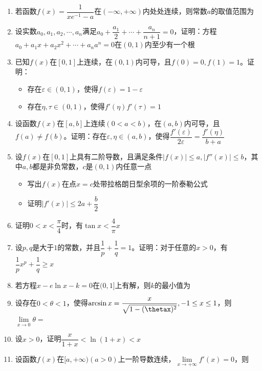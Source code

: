 \documentclass[./book.tex]{subfiles}
\begin{document}
    \begin{enumerate}
        \item 若函数$f(x) = \dfrac{1}{xe^{-1} - a}$在$(-\infty, +\infty)$内处处连续，则常数$a$的取值范围为
        \item 设实数$a_0, a_1, a_2, \cdots, a_n$满足$a_0 + \dfrac{a_1}{2} + \cdots + \dfrac{a_n}{n+1} = 0$，证明：方程$a_0 + a_{1}x + a_{2}x^2 + \cdots + a_{n}a^n = 0$在$(0, 1)$内至少有一个根
        \item 已知$f(x)$在$[0, 1]$上连续，在$(0, 1)$内可导，且$f(0) = 0, f(1) = 1$。证明：
        \begin{itemize}
            \item 存在$\varepsilon \in (0, 1)$，使得$f(\varepsilon) = 1 - \varepsilon$
            \item 存在$\eta, \tau \in (0, 1)$，使得$f'(\eta)f'(\tau) = 1$
        \end{itemize}
        \item 设函数$f(x)$在$[a, b]$上连续$(0 < a < b)$，在$(a, b)$内可导，且$f(a) \neq f(b)$。证明：存在$\varepsilon, \eta \in (a, b)$，使得$\dfrac{f'(\varepsilon)}{2\varepsilon} = \dfrac{f'(\eta)}{b + a}$
        \item 设$f(x)$在$[0, 1]$上具有二阶导数，且满足条件$|f(x)| \leq a, |f''(x)| \leq b$，其中$a, b$都是非负常数，$c$是$(0, 1)$内任意一点
        \begin{itemize}
            \item 写出$f(x)$在点$x = c$处带拉格朗日型余项的一阶泰勒公式
            \item 证明$|f'(x)| \leq 2a + \dfrac{b}{2}$
        \end{itemize}
        \item 证明$0 < x < \dfrac{\pi}{4}$时，有$\tan x < \dfrac{4}{\pi}x$
        \item 设$p, q$是大于$1$的常数，并且$\dfrac{1}{p} + \dfrac{1}{q} = 1$。证明：对于任意的$x > 0$，有$\dfrac{1}{p}x^p + \dfrac{1}{q} \geq x$
        \item 若方程$x - e\ln x - k = 0$在$(0, 1]$上有解，则$k$的最小值为
        \item 设存在$0 < \theta < 1$，使得$\arcsin x = \dfrac{x}{\sqrt{1 - (\thetax)^2}}, -1 \leq x \leq 1$，则$\lim\limits_{x\to 0}\theta = $
        \item 设$x > 0$，证明$\dfrac{x}{1+x} < \ln (1+x) < x$
        \item 设函数$f(x)$在$[a, +\infty)(a > 0)$上一阶导数连续，$\lim\limits_{x\to +\infty} f'(x) = 0$，则
        \begin{enumerate}

\end{enumerate}
\end{enumerate}
\end{document}
